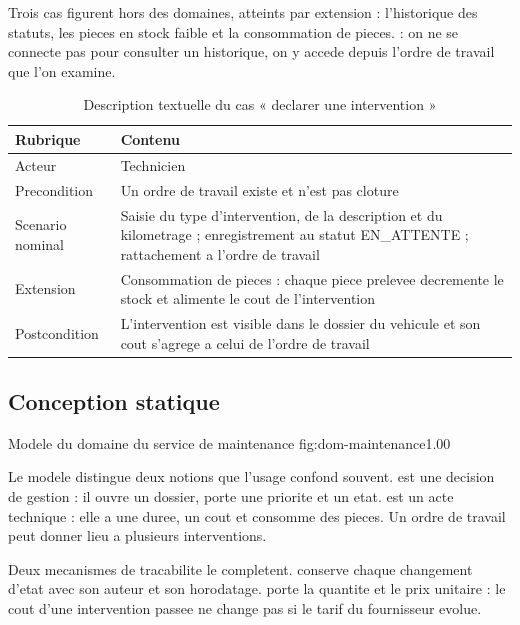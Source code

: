 Trois cas figurent hors des domaines, atteints par extension :
l'historique des statuts, les pieces en stock faible et la consommation
de pieces.  : on ne se connecte pas
pour consulter un historique, on y accede depuis l'ordre de travail que
l'on examine.

\begin{table}[H]
\centering
\caption{Description textuelle du cas « declarer une intervention »}
\label{tab:desc-intervention}
\small
\begin{tabularx}{\textwidth}{@{}p{2.5cm}X@{}}
\toprule
\textbf{Rubrique} & \textbf{Contenu} \\ \midrule
Acteur & Technicien \\
Precondition & Un ordre de travail existe et n'est pas cloture \\
Scenario nominal & Saisie du type d'intervention, de la description et du
  kilometrage ; enregistrement au statut EN\_ATTENTE ; rattachement a
  l'ordre de travail \\
Extension & Consommation de pieces : chaque piece prelevee decremente le
  stock et alimente le cout de l'intervention \\
Postcondition & L'intervention est visible dans le dossier du vehicule et
  son cout s'agrege a celui de l'ordre de travail \\
\bottomrule
\end{tabularx}
\end{table}

\subsection{Conception statique}

  {Modele du domaine du service de maintenance}
  {fig:dom-maintenance}{1.00}

Le modele distingue deux notions que l'usage confond souvent.
 est une decision de gestion : il ouvre un
dossier, porte une priorite et un etat.  est un
acte technique : elle a une duree, un cout et consomme des pieces. Un
ordre de travail peut donner lieu a plusieurs interventions.

Deux mecanismes de tracabilite le completent. 
conserve chaque changement d'etat avec son auteur et son horodatage.
 porte la quantite et le prix unitaire
 : le cout
d'une intervention passee ne change pas si le tarif du fournisseur
evolue.


